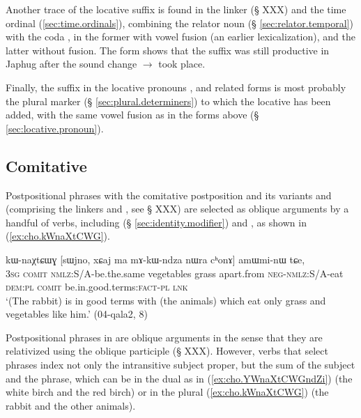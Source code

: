 Another trace of the locative suffix  is found in the linker  (§ XXX) and the time ordinal  (\ref{sec:time.ordinals}), combining the relator noun  (§ \ref{sec:relator.temporal}) with the coda , in the former with vowel fusion (an earlier lexicalization), and the latter without fusion. The form    shows that the suffix  was still productive in Japhug after the sound change  $\rightarrow$  took place.

Finally, the suffix  in the locative pronouns ,  and related forms is most probably the plural marker  (§ \ref{sec:plural.determiners}) to which the locative  has been added, with the same vowel fusion as in the forms above (§ \ref{sec:locative.pronoun}).


\subsection{Comitative} \label{sec:comitative} 
Postpositional phrases with the comitative postposition  and its variants  and  (comprising the linkers  and , see § XXX) are selected as oblique arguments by a handful of verbs, including  (§ \ref{sec:identity.modifier}) and , as shown in (\ref{ex:cho.kWnaXtCWG}).

\begin{exe}
\ex \label{ex:cho.kWnaXtCWG}
 kɯ-naχtɕɯɣ [sɯjno, xɕaj ma mɤ-kɯ-ndza nɯra cʰonɤ] amɯmi-nɯ tɕe, \\
\textsc{3sg} \textsc{comit} \textsc{nmlz}:S/A-be.the.same vegetables grass apart.from \textsc{neg}-\textsc{nmlz}:S/A-eat \textsc{dem}:\textsc{pl} \textsc{comit} be.in.good.terms:\textsc{fact}-\textsc{pl} \textsc{lnk} \\
\glt `(The rabbit) is in good terms with (the animals) which eat only grass and vegetables like him.' (04-qala2, 8)
\end{exe}

Postpositional phrases in  are oblique arguments in the sense that they are relativized using the oblique participle (§ XXX). However, verbs that select  phrases index not only the intransitive subject proper, but the sum of the subject and the  phrase, which can be in the dual as in (\ref{ex:cho.YWnaXtCWGndZi}) (the white birch and the red birch) or in the plural (\ref{ex:cho.kWnaXtCWG}) (the rabbit and the other animals). 

